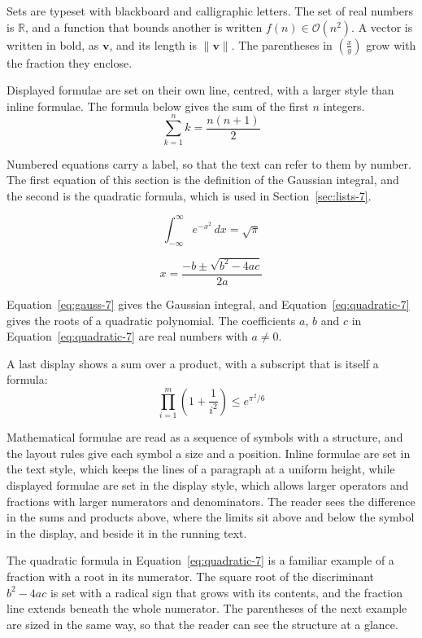 \documentclass{article}
\begin{document}
Sets are typeset with blackboard and calligraphic letters. The set of real numbers is
$\mathbb{R}$, and a function that bounds another is written $f(n) \in \mathcal{O}(n^2)$.
A vector is written in bold, as $\mathbf{v}$, and its length is $\|\mathbf{v}\|$. The
parentheses in $\left( \frac{x}{y} \right)$ grow with the fraction they enclose.

Displayed formulae are set on their own line, centred, with a larger style than inline
formulae. The formula below gives the sum of the first $n$ integers.
\[
  \sum_{k=1}^{n} k = \frac{n(n+1)}{2}
\]

Numbered equations carry a label, so that the text can refer to them by number. The
first equation of this section is the definition of the Gaussian integral, and the
second is the quadratic formula, which is used in Section~\ref{sec:lists-7}.

\begin{equation}\label{eq:gauss-7}
  \int_{-\infty}^{\infty} e^{-x^{2}}\,dx = \sqrt{\pi}
\end{equation}

\begin{equation}\label{eq:quadratic-7}
  x = \frac{-b \pm \sqrt{b^{2}-4ac}}{2a}
\end{equation}

Equation~\ref{eq:gauss-7} gives the Gaussian integral, and
Equation~\ref{eq:quadratic-7} gives the roots of a quadratic polynomial. The coefficients
$a$, $b$ and $c$ in Equation~\ref{eq:quadratic-7} are real numbers with $a \neq 0$.

A last display shows a sum over a product, with a subscript that is itself a formula:
\[
  \prod_{i=1}^{m} \left( 1 + \frac{1}{i^{2}} \right) \leq e^{\pi^{2}/6}
\]

Mathematical formulae are read as a sequence of symbols with a structure, and the layout
rules give each symbol a size and a position. Inline formulae are set in the text style,
which keeps the lines of a paragraph at a uniform height, while displayed formulae are
set in the display style, which allows larger operators and fractions with larger
numerators and denominators. The reader sees the difference in the sums and products
above, where the limits sit above and below the symbol in the display, and beside it in
the running text.

The quadratic formula in Equation~\ref{eq:quadratic-7} is a familiar example of a
fraction with a root in its numerator. The square root of the discriminant
$b^{2}-4ac$ is set with a radical sign that grows with its contents, and the
fraction line extends beneath the whole numerator. The parentheses of the next example
are sized in the same way, so that the reader can see the structure at a glance.
\end{document}
